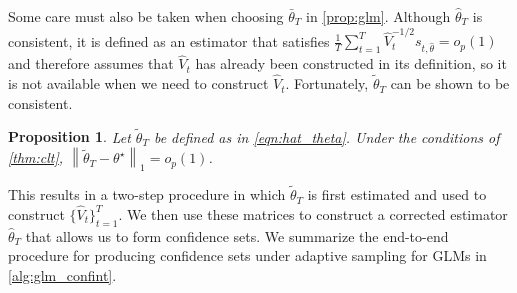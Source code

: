 \documentclass[11pt]{article}
\newcommand{\norm}[1]{\left\lVert#1\right\rVert}
\newtheorem{proposition}{Proposition}
\begin{document}
Some care must also be taken when choosing $\bar{\theta}_{T}$ in \cref{prop:glm}. Although $\hat{\theta}_{T}$ is consistent, it is defined as an estimator that satisfies $\frac{1}{T} \sum_{t=1}^{T} \hat{V}_{t}^{-1/2}s_{t,\hat{\theta}} = o_{p}(1)$ and therefore assumes that $\hat{V}_{t}$ has already been constructed in its definition, so it is not available when we need to construct $\hat{V}_{t}$. Fortunately, $\tilde{\theta}_{T}$ can be shown to be consistent.
\begin{proposition} \label{prop:consistency_tilde}
Let $\tilde{\theta}_{T}$ be defined as in \cref{eqn:hat_theta}. Under the conditions of \cref{thm:clt}, $\norm{\tilde{\theta}_{T}-  \theta^{\star}}_{1} = o_{p}(1)$.
\end{proposition}
This results in a two-step procedure in which $\tilde{\theta}_{T}$ is first estimated and used to construct $\{\hat{V}_{t}\}_{t=1}^{T}$. We then use these matrices to construct a corrected estimator $\hat{\theta}_{T}$ that allows us to form confidence sets. We summarize the end-to-end procedure for producing confidence sets under adaptive sampling for GLMs in \cref{alg:glm_confint}. 
\end{document}
